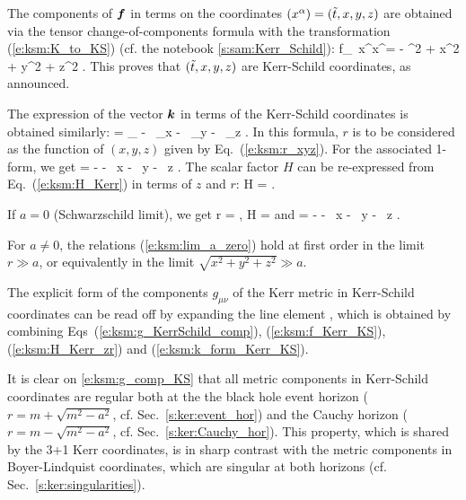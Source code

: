 The components of $\bm{f}$ in terms on the coordinates
$(x^\alpha)=({\tilde t}, x, y, z)$ are obtained
via the tensor change-of-components formula with
the transformation (\ref{e:ksm:K_to_KS})
(cf. the notebook \ref{s:sam:Kerr_Schild}):
\be \label{e:ksm:f_Kerr_KS}
 f_{\mu\nu}\,  \D x^\mu \D x^\nu = - \D\ti^2 + \D x^2 + \D y^2 + \D z^2 .
\ee
This proves that $({\tilde t}, x, y, z)$ are Kerr-Schild coordinates, as announced.

The expression of the vector $\bm{k}$ in terms of the Kerr-Schild coordinates
is obtained similarly:
\be
     = \wpar_{\ti} -  \, \wpar_x
        -  \, \wpar_y
        - \, \wpar_z .
\ee
In this formula, $r$ is to be considered as the function of $(x,y,z)$ given
by Eq.~(\ref{e:ksm:r_xyz}). For the associated 1-form, we get
\be \label{e:ksm:k_form_Kerr_KS}
     = - \dd\ti -  \, \dd x
       -  \, \dd y
        - \, \dd z .
\ee
The scalar factor $H$ can be re-expressed from Eq.~(\ref{e:ksm:H_Kerr})
in terms of $z$ and $r$:
\be \label{e:ksm:H_Kerr_zr}
    H =   .
\ee

\begin{remark}
If $a=0$ (Schwarzschild limit), we get
\be \label{e:ksm:lim_a_zero}
    r = , \quad
    H =  \quad\mbox{and}\quad
     = - \dd\ti -  \, \dd x
       -  \, \dd y
        - \, \dd z .
\ee
\end{remark}

\begin{remark}
For $a \not = 0$, the relations (\ref{e:ksm:lim_a_zero}) hold at first order
in the limit $r \gg a$, or equivalently in the limit $\sqrt{x^2 + y^2 + z^2} \gg a$.
\end{remark}

The explicit form of the components
$g_{\mu\nu}$ of the Kerr metric in Kerr-Schild coordinates can be read off by expanding the line
element
\be \label{e:ksm:g_comp_KS}
 ,
\ee
which is obtained by combining Eqs~(\ref{e:ksm:g_KerrSchild_comp}), (\ref{e:ksm:f_Kerr_KS}),
(\ref{e:ksm:H_Kerr_zr})
and (\ref{e:ksm:k_form_Kerr_KS}).
\begin{remark}
It is clear on \eqref{e:ksm:g_comp_KS} that all metric components in Kerr-Schild
coordinates are regular both at the the black hole event horizon
($r= m + \sqrt{m^2 - a^2}$, cf. Sec.~\ref{s:ker:event_hor}) and the Cauchy horizon
($r = m - \sqrt{m^2 - a^2}$, cf. Sec.~\ref{s:ker:Cauchy_hor}).
This property, which is shared by the 3+1 Kerr coordinates,
is in sharp contrast with the metric components in
Boyer-Lindquist coordinates, which are singular at both horizons (cf. Sec.~\ref{s:ker:singularities}).
\end{remark}

